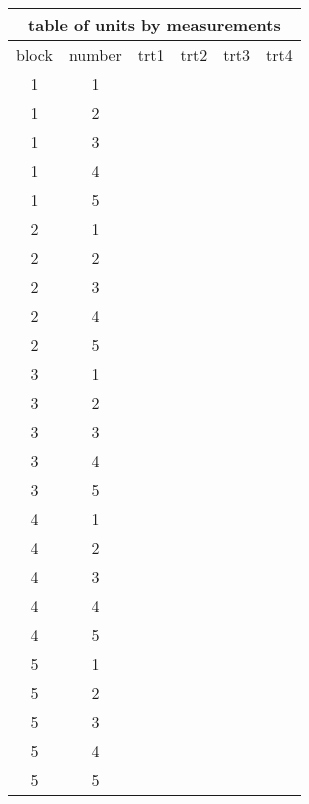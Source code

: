 \documentclass[letterpaper,11pt]{article}
\begin{document}
\begin{center}
\begin{tabular}{ |c|c|c|c|c|c| }
 \hline
 \multicolumn{6}{|c|}{table of units by measurements} \\
 \hline
block & number & trt1 & trt2 & trt3 & trt4 \\
 \hline
 1&1 & & & & \\
  1&2 & & & & \\
   1&3 & & & & \\
    1&4 & & & & \\
     1&5 & & & & \\
      \hline
      2&1 & & & & \\
       2&2 & & & & \\
        2&3 & & & & \\
         2&4 & & & & \\
          2&5 & & & & \\
           \hline
           3&1 & & & & \\
            3&2 & & & & \\
             3&3 & & & & \\
              3&4 & & & & \\
               3&5 & & & & \\
                \hline
                4&1 & & & & \\
                 4&2 & & & & \\
                  4&3 & & & & \\
                   4&4 & & & & \\
                    4&5 & & & & \\
                      \hline
                     5&1 & & & & \\
                      5&2 & & & & \\
                       5&3 & & & & \\
                        5&4 & & & & \\
                         5&5 & & & & \\

 \hline
\end{tabular}
\end{center}
\end{document}
